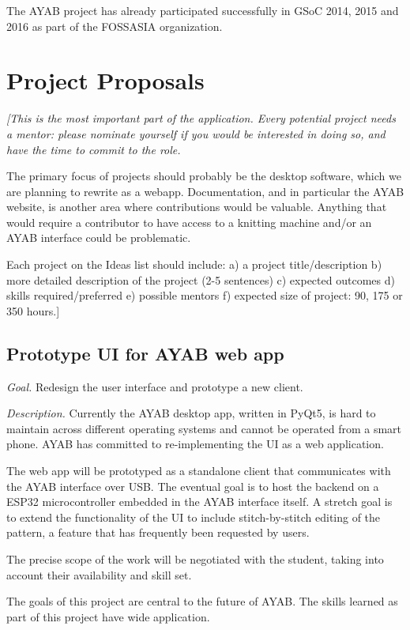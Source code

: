 \documentclass{article}
\begin{document}
The AYAB project has already participated successfully in GSoC 2014, 2015 and 2016 as part of the FOSSASIA organization.

\section{Project Proposals}

{\itshape
[This is the most important part of the application. Every potential project needs a mentor: please nominate yourself if you would be interested in doing so, and have the time to commit to the role.

The primary focus of projects should probably be the desktop software, which we are planning to rewrite as a webapp. Documentation, and in particular the AYAB website, is another area where contributions would be valuable. Anything that would require a contributor to have access to a knitting machine and/or an AYAB interface could be problematic.

Each project on the Ideas list should include: a) a project title/description b) more detailed description of the project (2-5 sentences) c) expected outcomes d) skills required/preferred e) possible mentors f) expected size of project: 90, 175 or 350 hours.]
}

\subsection{Prototype UI for AYAB web app}

\textit{Goal.} Redesign the user interface and prototype a new client.

\textit{Description.} Currently the AYAB desktop app, written in PyQt5, is hard to maintain across different operating systems and cannot be operated from a smart phone. AYAB has committed to re-implementing the UI as a web application.

The web app will be prototyped as a standalone client that communicates with the AYAB interface over USB. The eventual goal is to host the backend on a ESP32 microcontroller embedded in the AYAB interface itself. A stretch goal is to extend the functionality of the UI to include stitch-by-stitch editing of the pattern, a feature that has frequently been requested by users.

The precise scope of the work will be negotiated with the student, taking into account their availability and skill set.

The goals of this project are central to the future of AYAB. The skills learned as part of this project have wide application.
\end{document}
